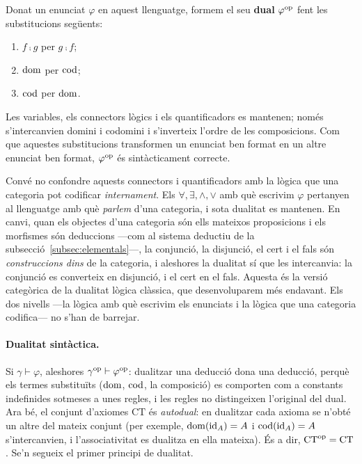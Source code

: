 Donat un enunciat $\varphi$ en aquest llenguatge, formem el seu \textbf{dual} $\varphi^{\mathrm{op}}$ fent les substitucions següents:
\begin{enumerate}
  \item $f\comp g$ per $g\comp f$;
  \item $\operatorname{dom}$ per $\operatorname{cod}$;
  \item $\operatorname{cod}$ per $\operatorname{dom}$.
\end{enumerate}
Les variables, els connectors lògics i els quantificadors es mantenen; només s'intercanvien domini i codomini i s'inverteix l'ordre de les composicions. Com que aquestes substitucions transformen un enunciat ben format en un altre enunciat ben format, $\varphi^{\mathrm{op}}$ és sintàcticament correcte.

\begin{observacio}
Convé no confondre aquests connectors i quantificadors amb la lògica que una categoria pot codificar \emph{internament}. Els $\forall,\exists,\wedge,\vee$ amb què escrivim $\varphi$ pertanyen al llenguatge amb què \emph{parlem} d'una categoria, i sota dualitat es mantenen. En canvi, quan els objectes d'una categoria són ells mateixos proposicions i els morfismes són deduccions ---com al sistema deductiu de la subsecció~\ref{subsec:elementals}---, la conjunció, la disjunció, el cert i el fals són \emph{construccions dins} de la categoria, i aleshores la dualitat sí que les intercanvia: la conjunció es converteix en disjunció, i el cert en el fals. Aquesta és la versió categòrica de la dualitat lògica clàssica, que desenvoluparem més endavant. Els dos nivells ---la lògica amb què escrivim els enunciats i la lògica que una categoria codifica--- no s'han de barrejar.
\end{observacio}

\paragraph{Dualitat sintàctica.}
Si $\gamma\vdash\varphi$, aleshores $\gamma^{\mathrm{op}}\vdash\varphi^{\mathrm{op}}$: dualitzar una deducció dona una deducció, perquè els termes substituïts ($\operatorname{dom}$, $\operatorname{cod}$, la composició) es comporten com a constants indefinides sotmeses a unes regles, i les regles no distingeixen l'original del dual. Ara bé, el conjunt d'axiomes $\mathrm{CT}$ és \emph{autodual}: en dualitzar cada axioma se n'obté un altre del mateix conjunt (per exemple, $\operatorname{dom}(\operatorname{id}_A)=A$ i $\operatorname{cod}(\operatorname{id}_A)=A$ s'intercanvien, i l'associativitat es dualitza en ella mateixa). És a dir, $\mathrm{CT}^{\mathrm{op}}=\mathrm{CT}$. Se'n segueix el primer principi de dualitat.

